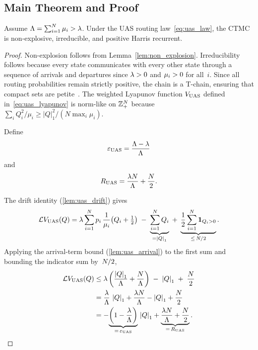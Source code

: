 \subsection{Main Theorem and Proof}
\label{sec:uas:theorem}

\begin{theorem}
\label{thm:uas}
Assume $\Lambda = \sum_{i=1}^{N} \mu_i > \lambda$. Under the UAS routing law~\eqref{eq:uas_law}, the CTMC is non-explosive, irreducible, and positive Harris recurrent.
\end{theorem}

\begin{proof}
Non-explosion follows from Lemma~\ref{lem:non_explosion}. Irreducibility follows because every state communicates with every other state through a sequence of arrivals and departures since $\lambda > 0$ and $\mu_i > 0$ for all~$i$. Since all routing probabilities remain strictly positive, the chain is a T-chain, ensuring that compact sets are petite~\cite[Theorem~4.6]{meyn2009markov}. The weighted Lyapunov function $V_{\mathrm{UAS}}$ defined in~\eqref{eq:uas_lyapunov} is norm-like on $\mathbb{Z}_+^N$ because $\sum_i Q_i^2/\mu_i \geq |Q|_1^2 / (N \max_i \mu_i)$.

Define
\begin{equation}
\label{eq:uas_epsilon}
\varepsilon_{\mathrm{UAS}} = \frac{\Lambda - \lambda}{\Lambda}
\end{equation}
and
\begin{equation}
\label{eq:uas_R}
R_{\mathrm{UAS}} = \frac{\lambda N}{\Lambda} + \frac{N}{2}.
\end{equation}

The drift identity (\cref{lem:uas_drift}) gives
\[
\mathcal{L} V_{\mathrm{UAS}}(Q)
= \lambda \sum_{i=1}^{N} p_{i}\,\frac{1}{\mu_i}\bigl(Q_{i}+\tfrac{1}{2}\bigr)
\;-\; \underbrace{\sum_{i=1}^{N} Q_{i}}_{= \left\lvert Q \right\rvert_1}
\;+\; \underbrace{\frac{1}{2}\sum_{i=1}^{N} \mathbf{1}_{Q_{i}>0}}_{\leq\, N/2}.
\]
Applying the arrival-term bound (\cref{lem:uas_arrival}) to the first sum and bounding the indicator sum by~$N/2$,
\begin{align}
\mathcal{L} V_{\mathrm{UAS}}(Q)
&\leq \lambda \left( \frac{\left\lvert Q \right\rvert_1}{\Lambda} + \frac{N}{\Lambda} \right)
  \;-\; \left\lvert Q \right\rvert_1
  \;+\; \frac{N}{2} \nonumber \\
&= \frac{\lambda}{\Lambda}\,\left\lvert Q \right\rvert_1
  + \frac{\lambda N}{\Lambda}
  - \left\lvert Q \right\rvert_1
  + \frac{N}{2} \nonumber \\
&= -\!\underbrace{\left(1 - \frac{\lambda}{\Lambda}\right)}_{=\,\varepsilon_{\mathrm{UAS}}}\, \left\lvert Q \right\rvert_1
  + \underbrace{\frac{\lambda N}{\Lambda} + \frac{N}{2}}_{=\, R_{\mathrm{UAS}}}.
\label{eq:uas_final_drift}
\end{align}


\end{proof}

